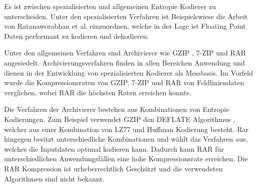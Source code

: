 Es ist zwischen spezialisierten und allgemeinen Entropie Kodierer zu unterscheiden. Unter den spezialisierten Verfahren ist Beispielswiese die Arbeit von Ratanaworabhan et al. \cite{ratanaworabhan2006fast} einzuordnen, welche in der Lage ist Floating Point Daten performant zu kodieren und dekodieren.
 
Unter den allgemeinen Verfahren sind Archivierer wie GZIP \cite{website:gzip}, 7-ZIP \cite{website:7zip} und RAR \cite{website:rar} angesiedelt. Archivierungsverfahren finden in allen Bereichen Anwendung und dienen in der Entwicklung von spezialisierten Kodierer als Messbasis. Im Vorfeld wurde die Kompressionsraten von GZIP, 7-ZIP und RAR von Feldliniendaten verglichen, wobei RAR die höchsten Raten erreichen konnte.

Die Verfahren der Archivierer bestehen aus Kombinationen von Entropie Kodierungen. Zum Beispiel verwendet GZIP den DEFLATE Algorithmus \cite{deutsch1996deflate}, welcher aus einer Kombination von LZ77 \cite{ziv1977universal} und Huffman \cite{huffman1952method} Kodierung besteht. Rar hingegen besitzt unterschiedliche Kombinationen und wählt das Verfahren aus, welches die Inputdaten optimal kodieren kann. Dadurch kann RAR für unterschiedlichen Anwendungsfällen eine hohe Kompressionsrate erreichen. Die RAR Kompression ist urheberrechtlich Geschützt und die verwendeten Algorithmen sind nicht bekannt.